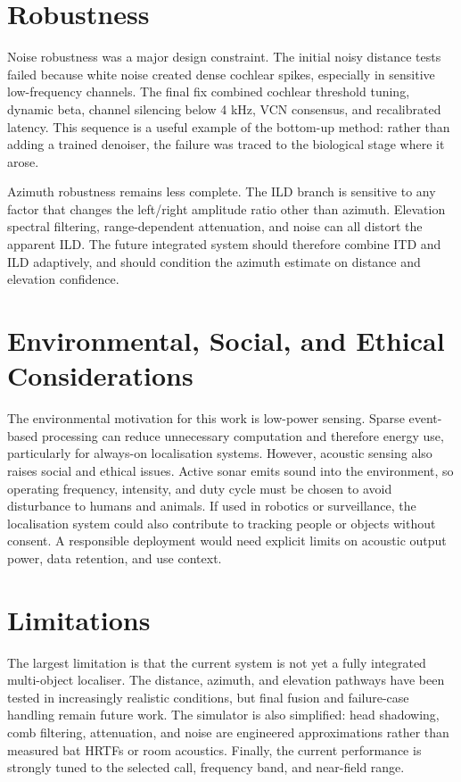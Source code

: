 \documentclass[12pt,a4paper]{report}
\begin{document}
\section{Robustness}

Noise robustness was a major design constraint. The initial noisy distance tests failed because white noise created dense cochlear spikes, especially in sensitive low-frequency channels. The final fix combined cochlear threshold tuning, dynamic beta, channel silencing below 4 kHz, VCN consensus, and recalibrated latency. This sequence is a useful example of the bottom-up method: rather than adding a trained denoiser, the failure was traced to the biological stage where it arose.

Azimuth robustness remains less complete. The ILD branch is sensitive to any factor that changes the left/right amplitude ratio other than azimuth. Elevation spectral filtering, range-dependent attenuation, and noise can all distort the apparent ILD. The future integrated system should therefore combine ITD and ILD adaptively, and should condition the azimuth estimate on distance and elevation confidence.

\section{Environmental, Social, and Ethical Considerations}

The environmental motivation for this work is low-power sensing. Sparse event-based processing can reduce unnecessary computation and therefore energy use, particularly for always-on localisation systems. However, acoustic sensing also raises social and ethical issues. Active sonar emits sound into the environment, so operating frequency, intensity, and duty cycle must be chosen to avoid disturbance to humans and animals. If used in robotics or surveillance, the localisation system could also contribute to tracking people or objects without consent. A responsible deployment would need explicit limits on acoustic output power, data retention, and use context.

\section{Limitations}

The largest limitation is that the current system is not yet a fully integrated multi-object localiser. The distance, azimuth, and elevation pathways have been tested in increasingly realistic conditions, but final fusion and failure-case handling remain future work. The simulator is also simplified: head shadowing, comb filtering, attenuation, and noise are engineered approximations rather than measured bat HRTFs or room acoustics. Finally, the current performance is strongly tuned to the selected call, frequency band, and near-field range.
\end{document}

